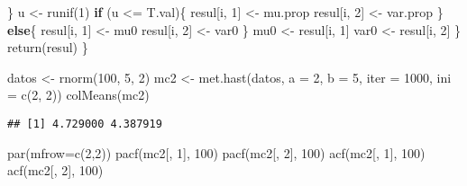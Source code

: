 \documentclass[
  spanish,
]{book}
\newenvironment{Shaded}{\begin{snugshade}}{\end{snugshade}}
\newcommand{\AttributeTok}[1]{\textcolor[rgb]{0.77,0.63,0.00}{#1}}
\newcommand{\ControlFlowTok}[1]{\textcolor[rgb]{0.13,0.29,0.53}{\textbf{#1}}}
\newcommand{\DecValTok}[1]{\textcolor[rgb]{0.00,0.00,0.81}{#1}}
\newcommand{\FunctionTok}[1]{\textcolor[rgb]{0.00,0.00,0.00}{#1}}
\newcommand{\NormalTok}[1]{#1}
\newcommand{\OtherTok}[1]{\textcolor[rgb]{0.56,0.35,0.01}{#1}}
\newcommand{\SpecialCharTok}[1]{\textcolor[rgb]{0.00,0.00,0.00}{#1}}
\theoremstyle{definition}
\theoremstyle{definition}
\theoremstyle{definition}
\theoremstyle{definition}
\theoremstyle{remark}
\begin{document}
\begin{Shaded}
\begin{Highlighting}[]
\NormalTok{    \}}
\NormalTok{    u }\OtherTok{\textless{}{-}} \FunctionTok{runif}\NormalTok{(}\DecValTok{1}\NormalTok{) }
    \ControlFlowTok{if}\NormalTok{ (u }\SpecialCharTok{\textless{}=}\NormalTok{ T.val)\{}
\NormalTok{      resul[i, }\DecValTok{1}\NormalTok{] }\OtherTok{\textless{}{-}}\NormalTok{ mu.prop}
\NormalTok{      resul[i, }\DecValTok{2}\NormalTok{] }\OtherTok{\textless{}{-}}\NormalTok{ var.prop}
\NormalTok{      \} }
    \ControlFlowTok{else}\NormalTok{\{}
\NormalTok{      resul[i, }\DecValTok{1}\NormalTok{] }\OtherTok{\textless{}{-}}\NormalTok{ mu0}
\NormalTok{      resul[i, }\DecValTok{2}\NormalTok{] }\OtherTok{\textless{}{-}}\NormalTok{ var0}
\NormalTok{      \}}
\NormalTok{    mu0 }\OtherTok{\textless{}{-}}\NormalTok{ resul[i, }\DecValTok{1}\NormalTok{]}
\NormalTok{    var0 }\OtherTok{\textless{}{-}}\NormalTok{ resul[i, }\DecValTok{2}\NormalTok{]}
\NormalTok{  \}}
  \FunctionTok{return}\NormalTok{(resul)}
\NormalTok{\}}

\NormalTok{datos }\OtherTok{\textless{}{-}} \FunctionTok{rnorm}\NormalTok{(}\DecValTok{100}\NormalTok{, }\DecValTok{5}\NormalTok{, }\DecValTok{2}\NormalTok{)}
\NormalTok{mc2 }\OtherTok{\textless{}{-}} \FunctionTok{met.hast}\NormalTok{(datos, }\AttributeTok{a =} \DecValTok{2}\NormalTok{, }\AttributeTok{b =} \DecValTok{5}\NormalTok{, }
                \AttributeTok{iter =} \DecValTok{1000}\NormalTok{, }\AttributeTok{ini =} \FunctionTok{c}\NormalTok{(}\DecValTok{2}\NormalTok{, }\DecValTok{2}\NormalTok{))}
\FunctionTok{colMeans}\NormalTok{(mc2)}
\end{Highlighting}
\end{Shaded}

\begin{verbatim}
## [1] 4.729000 4.387919
\end{verbatim}

\begin{Shaded}
\begin{Highlighting}[]
\FunctionTok{par}\NormalTok{(}\AttributeTok{mfrow=}\FunctionTok{c}\NormalTok{(}\DecValTok{2}\NormalTok{,}\DecValTok{2}\NormalTok{))}
\FunctionTok{pacf}\NormalTok{(mc2[, }\DecValTok{1}\NormalTok{], }\DecValTok{100}\NormalTok{)}
\FunctionTok{pacf}\NormalTok{(mc2[, }\DecValTok{2}\NormalTok{], }\DecValTok{100}\NormalTok{)}
\FunctionTok{acf}\NormalTok{(mc2[, }\DecValTok{1}\NormalTok{], }\DecValTok{100}\NormalTok{)}
\FunctionTok{acf}\NormalTok{(mc2[, }\DecValTok{2}\NormalTok{], }\DecValTok{100}\NormalTok{)}
\end{Highlighting}
\end{Shaded}
\end{document}
